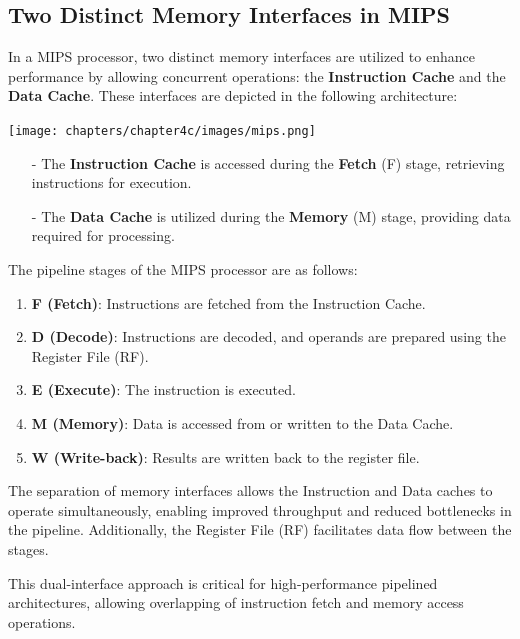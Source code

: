 \newpage
\subsection{Two Distinct Memory Interfaces in MIPS}
In a MIPS processor, two distinct memory interfaces are utilized to enhance performance by allowing concurrent operations: the \textbf{Instruction Cache} and the \textbf{Data Cache}. These interfaces are depicted in the following architecture:
\begin{center}
    \texttt{[image: chapters/chapter4c/images/mips.png]}
\end{center}
\begin{itemize}
    \item[-] The \textbf{Instruction Cache} is accessed during the \textbf{Fetch} (F) stage, retrieving instructions for execution.
    \item[-] The \textbf{Data Cache} is utilized during the \textbf{Memory} (M) stage, providing data required for processing.
\end{itemize}

The pipeline stages of the MIPS processor are as follows:
\begin{enumerate}
    \item \textbf{F (Fetch)}: Instructions are fetched from the Instruction Cache.
    \item \textbf{D (Decode)}: Instructions are decoded, and operands are prepared using the Register File (RF).
    \item \textbf{E (Execute)}: The instruction is executed.
    \item \textbf{M (Memory)}: Data is accessed from or written to the Data Cache.
    \item \textbf{W (Write-back)}: Results are written back to the register file.
\end{enumerate}

The separation of memory interfaces allows the Instruction and Data caches to operate simultaneously, enabling improved throughput and reduced bottlenecks in the pipeline. Additionally, the Register File (RF) facilitates data flow between the stages.

This dual-interface approach is critical for high-performance pipelined architectures, allowing overlapping of instruction fetch and memory access operations.

